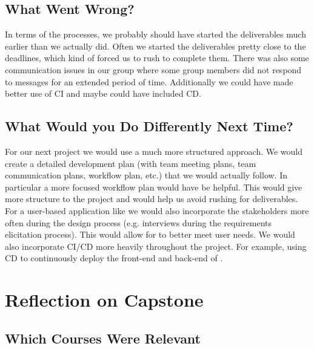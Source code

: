 \documentclass{article}
\begin{document}

\subsection{What Went Wrong?}

In terms of the processes, we probably should have started the deliverables much earlier than we actually did. Often we started the deliverables pretty close to the deadlines, which kind of forced us to rush to complete them. There was also some communication issues in our group where some group members did not respond to messages for an extended period of time. Additionally we could have made better use of CI and maybe could have included CD.


\subsection{What Would you Do Differently Next Time?}

For our next project we would use a much more structured approach. We would create a detailed development plan (with team meeting plans, team communication plans, workflow plan, etc.) that we would actually follow. In particular a more focused workflow plan would have be helpful. This would give more structure to the project and would help us avoid rushing for deliverables.   For a user-based application like \progname{} we would also incorporate the stakeholders more often during the design process (e.g. interviews during the requirements elicitation process). This would allow for \progname{} to better meet user needs. We would also incorporate CI/CD more heavily throughout the project. For example, using CD to continuously deploy the front-end and back-end of \progname{}. 


\section{Reflection on Capstone}


\subsection{Which Courses Were Relevant}
\end{document}

